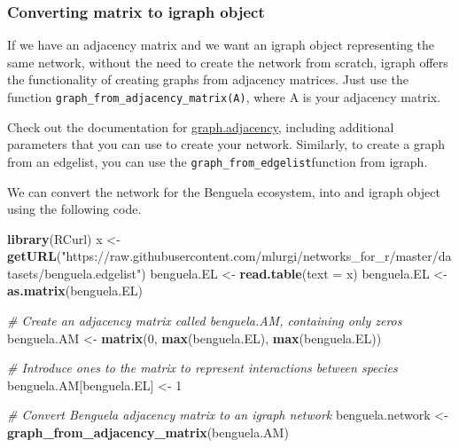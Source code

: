 \documentclass[
]{article}
\newenvironment{Shaded}{\begin{snugshade}}{\end{snugshade}}
\newcommand{\AttributeTok}[1]{\textcolor[rgb]{0.13,0.29,0.53}{#1}}
\newcommand{\CommentTok}[1]{\textcolor[rgb]{0.56,0.35,0.01}{\textit{#1}}}
\newcommand{\DecValTok}[1]{\textcolor[rgb]{0.00,0.00,0.81}{#1}}
\newcommand{\FunctionTok}[1]{\textcolor[rgb]{0.13,0.29,0.53}{\textbf{#1}}}
\newcommand{\NormalTok}[1]{#1}
\newcommand{\OtherTok}[1]{\textcolor[rgb]{0.56,0.35,0.01}{#1}}
\newcommand{\StringTok}[1]{\textcolor[rgb]{0.31,0.60,0.02}{#1}}
\begin{document}
\subsubsection{Converting matrix to igraph
object}\label{converting-matrix-to-igraph-object}

If we have an adjacency matrix and we want an igraph object representing
the same network, without the need to create the network from scratch,
igraph offers the functionality of creating graphs from adjacency
matrices. Just use the function
\texttt{graph\_from\_adjacency\_matrix(A)}, where A is your adjacency
matrix.

Check out the documentation for
\href{http://igraph.org/r/doc/graph_from_adjacency_matrix.html}{graph.adjacency},
including additional parameters that you can use to create your network.
Similarly, to create a graph from an edgelist, you can use the
\texttt{graph\_from\_edgelist}function from igraph.

We can convert the network for the Benguela ecosystem, into and igraph
object using the following code.

\begin{Shaded}
\begin{Highlighting}[]
\FunctionTok{library}\NormalTok{(RCurl)}
\NormalTok{x }\OtherTok{\textless{}{-}} \FunctionTok{getURL}\NormalTok{(}\StringTok{"https://raw.githubusercontent.com/mlurgi/networks\_for\_r/master/datasets/benguela.edgelist"}\NormalTok{)}
\NormalTok{benguela.EL }\OtherTok{\textless{}{-}} \FunctionTok{read.table}\NormalTok{(}\AttributeTok{text =}\NormalTok{ x) }
\NormalTok{benguela.EL }\OtherTok{\textless{}{-}} \FunctionTok{as.matrix}\NormalTok{(benguela.EL)}

\CommentTok{\# Create an adjacency matrix called benguela.AM, containing only zeros}
\NormalTok{benguela.AM }\OtherTok{\textless{}{-}} \FunctionTok{matrix}\NormalTok{(}\DecValTok{0}\NormalTok{, }\FunctionTok{max}\NormalTok{(benguela.EL), }\FunctionTok{max}\NormalTok{(benguela.EL))}

\CommentTok{\# Introduce ones to the matrix to represent interactions between species}
\NormalTok{benguela.AM[benguela.EL] }\OtherTok{\textless{}{-}} \DecValTok{1}

\CommentTok{\# Convert Benguela adjacency matrix to an igraph network}
\NormalTok{benguela.network }\OtherTok{\textless{}{-}} \FunctionTok{graph\_from\_adjacency\_matrix}\NormalTok{(benguela.AM)}
\end{Highlighting}
\end{Shaded}
\end{document}
